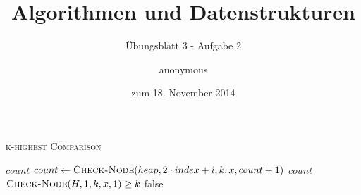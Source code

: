 \documentclass[a4paper]{scrartcl}
\title{Algorithmen und Datenstrukturen}
\subtitle{Übungsblatt 3 - Aufgabe 2}
\author{
    anonymous
}
\date{zum 18. November 2014}
\begin{document}
\maketitle


\begin{algorithm}
    \caption{\textsc{k-highest Comparison}}
    \begin{algorithmic}[1]
                    \State \Return $count$
                \EndIf
                    \State $count \gets \Call{Check-Node}{heap, 2 \cdot index + i, k, x, count + 1}$
                \EndIf
            \EndFor
            \State \Return $count$
        \EndProcedure
        \Statex
                \State \Return $\Call{Check-Node}{H, 1, k, x, 1} \geq k$
            \EndIf
            \State \Return false
        \EndProcedure
    \end{algorithmic}
\end{algorithm}
\end{document}
